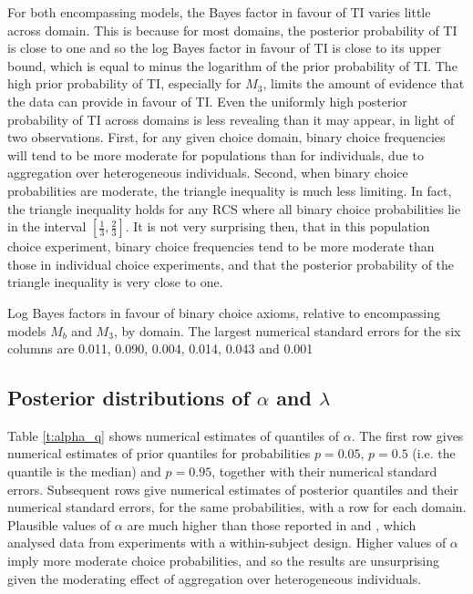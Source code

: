 \documentclass[11pt,letter]{article}
\begin{document}
For both encompassing models, the Bayes factor in favour of TI varies little across domain.
This is because for most domains, the posterior probability of TI is close to one and so the log Bayes factor in favour of TI is close to its upper bound, which is equal to minus the logarithm of the prior probability of TI.
The high prior probability of TI, especially for $M_3$, limits the amount of evidence that the data can provide in favour of TI.
Even the uniformly high posterior probability of TI across domains is less revealing than it may appear, in light of two observations.
First, for any given choice domain, binary choice frequencies will tend to be more moderate for populations than for individuals, due to aggregation over heterogeneous individuals.
Second, when binary choice probabilities are moderate, the triangle inequality is much less limiting.
In fact, the triangle inequality holds for any RCS where all binary choice probabilities lie in the interval $[\tfrac{1}{3},\tfrac{2}{3}]$.
It is not very surprising then, that in this population choice experiment, binary choice frequencies tend to be more moderate than those in individual choice experiments, and that the posterior probability of the triangle inequality is very close to one.

\begin{table}
  
  \caption{Log Bayes factors in favour of binary choice axioms, relative to encompassing models $M_b$ and $M_3$, by domain.
  The largest numerical standard errors for the six columns are 0.011, 0.090, 0.004, 0.014, 0.043 and 0.001}
  \label{t:bin}
\end{table}

\subsection{Posterior distributions of $\alpha$ and $\lambda$}

Table \ref{t:alpha_q} shows numerical estimates of quantiles of $\alpha$.
The first row gives numerical estimates of prior quantiles for probabilities $p=0.05$, $p=0.5$ (i.e. the quantile is the median) and $p=0.95$, together with their numerical standard errors.
Subsequent rows give numerical estimates of posterior quantiles and their numerical standard errors, for the same probabilities, with a row for each domain.
Plausible values of $\alpha$ are much higher than those reported in  and , which analysed data from experiments with a within-subject design.
Higher values of $\alpha$ imply more moderate choice probabilities, and so the results are unsurprising given the moderating effect of aggregation over heterogeneous individuals.
\end{document}
